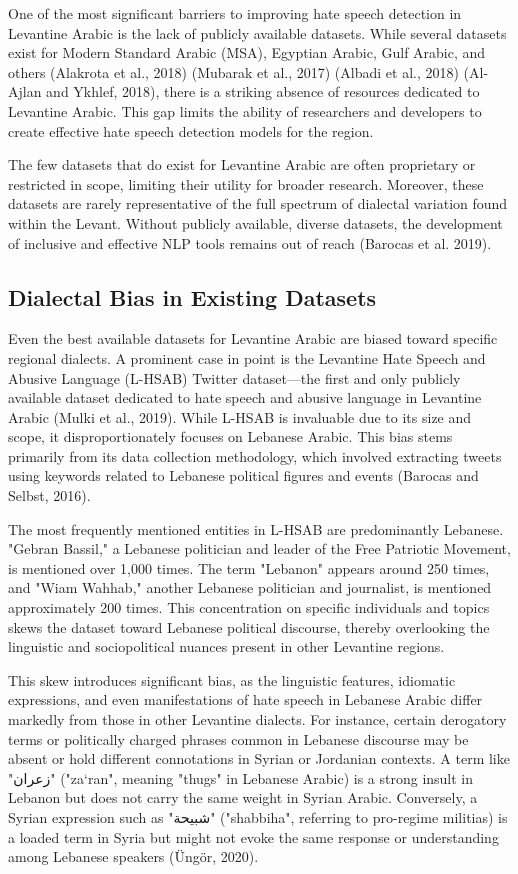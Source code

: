 \documentclass[11pt]{article}
\begin{document}
One of the most significant barriers to improving hate speech detection in Levantine Arabic is the lack of publicly available datasets. While several datasets exist for Modern Standard Arabic (MSA), Egyptian Arabic, Gulf Arabic, and others (Alakrota et al., 2018) (Mubarak et al., 2017) (Albadi et al., 2018) (Al-Ajlan and Ykhlef, 2018), there is a striking absence of resources dedicated to Levantine Arabic. This gap limits the ability of researchers and developers to create effective hate speech detection models for the region.

The few datasets that do exist for Levantine Arabic are often proprietary or restricted in scope, limiting their utility for broader research. Moreover, these datasets are rarely representative of the full spectrum of dialectal variation found within the Levant. Without publicly available, diverse datasets, the development of inclusive and effective NLP tools remains out of reach (Barocas et al. 2019).

\subsection{Dialectal Bias in Existing Datasets}

Even the best available datasets for Levantine Arabic are biased toward specific regional dialects. A prominent case in point is the Levantine Hate Speech and Abusive Language (L-HSAB) Twitter dataset—the first and only publicly available dataset dedicated to hate speech and abusive language in Levantine Arabic (Mulki et al., 2019). While L-HSAB is invaluable due to its size and scope, it disproportionately focuses on Lebanese Arabic. This bias stems primarily from its data collection methodology, which involved extracting tweets using keywords related to Lebanese political figures and events (Barocas and Selbst, 2016).

The most frequently mentioned entities in L-HSAB are predominantly Lebanese. "Gebran Bassil," a Lebanese politician and leader of the Free Patriotic Movement, is mentioned over 1,000 times. The term "Lebanon" appears around 250 times, and "Wiam Wahhab," another Lebanese politician and journalist, is mentioned approximately 200 times. This concentration on specific individuals and topics skews the dataset toward Lebanese political discourse, thereby overlooking the linguistic and sociopolitical nuances present in other Levantine regions.

This skew introduces significant bias, as the linguistic features, idiomatic expressions, and even manifestations of hate speech in Lebanese Arabic differ markedly from those in other Levantine dialects. For instance, certain derogatory terms or politically charged phrases common in Lebanese discourse may be absent or hold different connotations in Syrian or Jordanian contexts. A term like "زعران" ("za‘ran", meaning "thugs" in Lebanese Arabic) is a strong insult in Lebanon but does not carry the same weight in Syrian Arabic. Conversely, a Syrian expression such as "شبيحة" ("shabbiha", referring to pro-regime militias) is a loaded term in Syria but might not evoke the same response or understanding among Lebanese speakers (Üngör, 2020). 
\end{document}
